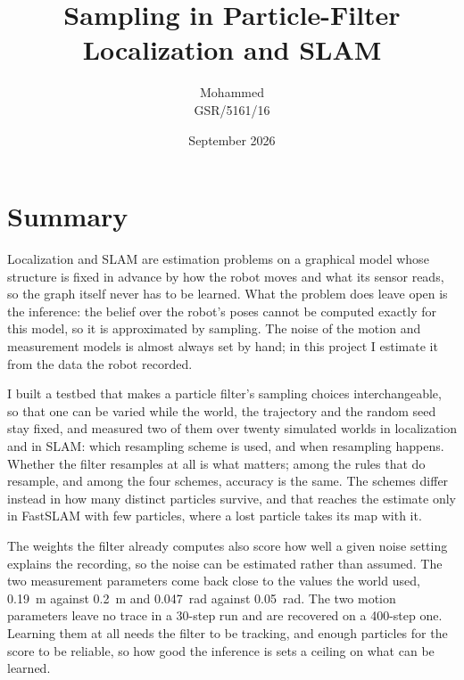 \documentclass[11pt,a4paper]{article}
\title{Sampling in Particle-Filter Localization and SLAM}
\author{Mohammed \\ \normalsize GSR/5161/16}
\date{September 2026}
\begin{document}
\maketitle

\section*{Summary}

Localization and SLAM are estimation problems on a graphical model whose structure is fixed in advance by how the
robot moves and what its sensor reads, so the graph itself never has to be learned. What the problem does leave
open is the inference: the belief over the robot's poses cannot be computed exactly for this model, so it is
approximated by sampling. The noise of the motion and measurement models is almost always set by hand; in this
project I estimate it from the data the robot recorded.

I built a testbed that makes a particle filter's sampling choices interchangeable, so that one can be varied
while the world, the trajectory and the random seed stay fixed, and measured two of them over twenty simulated
worlds in localization and in SLAM: which resampling scheme is used, and when resampling happens. Whether the
filter resamples at all is what matters; among the rules that do resample, and among the four schemes, accuracy
is the same. The schemes differ instead in how many distinct particles survive, and that reaches the estimate
only in FastSLAM with few particles, where a lost particle takes its map with it.

The weights the filter already computes also score how well a given noise setting explains the recording, so the
noise can be estimated rather than assumed. The two measurement parameters come back close to the values the
world used, \SI{0.19}{\meter} against \SI{0.2}{\meter} and \SI{0.047}{\radian} against \SI{0.05}{\radian}. The
two motion parameters leave no trace in a 30-step run and are recovered on a 400-step one. Learning them at all
needs the filter to be tracking, and enough particles for the score to be reliable, so how good the inference is
sets a ceiling on what can be learned.






\small\sloppy\printbibliography[title=References]
\end{document}

